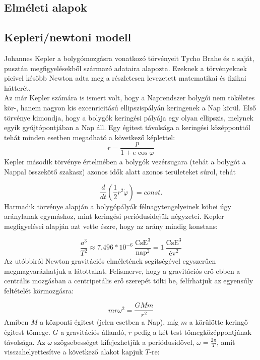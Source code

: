 \begin{multicols}{2}
\section{Elméleti alapok} \label{sec:2}
\subsection{Kepleri/newtoni modell} \label{sub:2.1}
Johannes Kepler a bolygómozgásra vonatkozó törvényeit Tycho Brahe és a saját, pusztán megfigyelésekből származó adataira alapozta. Ezeknek a törvényeknek picivel később Newton adta meg a részletesen levezetett matematikai és fizikai hátterét. \\
Az már Kepler számára is ismert volt, hogy a Naprendszer bolygói nem tökéletes kör-, hanem nagyon kis excenricitású ellipszispályán keringenek a Nap körül. Első törvénye kimondja, hogy a bolygók keringési pályája egy olyan ellipszis, melynek egyik gyújtópontjában a Nap áll. Egy égitest távolsága a keringési középponttól tehát minden esetben megadható a következő képlettel:
\begin{equation} \label{eq:1}
    r
    =
    \frac{p}{1 + e \cos{\varphi}}
\end{equation}
Kepler második törvénye értelmében a bolygók vezérsugara (tehát a bolygót a Nappal összekötő szakasz) azonos idők alatt azonos területeket súrol, tehát

\begin{equation} \label{eq:2}
    \frac{d}{dt} \left( \frac{1}{2} r^{2} \dot{\varphi} \right)
    =
    const.
\end{equation}
Harmadik törvénye alapján a bolygópályák félnagytengelyeinek köbei úgy aránylanak egymáshoz, mint keringési periódusidejük négyzetei. Kepler megfigyelései alapján azt vette észre, hogy az arány mindig konstans:

\begin{equation} \label{eq:3}
    \frac{a^{3}}{T^{2}}
    \approx
    7.496 * 10^{-6}\ \frac{\text{CsE}^{3}}{\text{nap}^{2}}
    =
    1\ \frac{\text{CsE}^{3}}{\text{év}^{2}}
\end{equation}
Az utóbbiról Newton gravitációs elméletének segítségével egyszerűen megmagyarázhatjuk a látottakat. Felismerve, hogy a gravitációs erő ebben a centrális mozgásban a centripetális erő szerepét tölti be, felírhatjuk az egyensúly feltételét körmozgásra:

\begin{equation} \label{eq:4}
    m r \omega^{2}
    =
    \frac{GMm}{r^{2}}
\end{equation}
Amiben $M$ a központi égitest (jelen esetben a Nap), míg $m$ a körülötte keringő égitest tömege. $G$ a gravitációs állandó, $r$ pedig a két test tömegközéppontjának távolsága. Az $\omega$ szögsebességet kifejezhetjük a periódusidővel, $\omega = \frac{2 \pi}{T}$, amit visszahelyettesítve a következő alakot kapjuk $T$-re:


\end{multicols}
